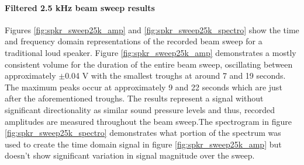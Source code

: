 \paragraph{Filtered 2.5 kHz beam sweep results}
Figures \ref{fig:spkr_sweep25k_amp} and \ref{fig:spkr_sweep25k_spectro} show the time and frequency domain representations of the recorded beam sweep for a traditional loud speaker. Figure \ref{fig:spkr_sweep25k_amp} demonstrates a mostly consistent volume for the duration of the entire beam sweep, oscillating between approximately $\pm$0.04 V with the smallest troughs at around 7 and 19 seconds. The maximum peaks occur at approximately 9 and 22 seconds which are just after the aforementioned troughs. The results represent a signal without significant directionality as similar sound pressure levels and thus, recorded amplitudes are measured throughout the beam sweep.The spectrogram in figure \ref{fig:spkr_sweep25k_spectro} demonstrates what portion of the spectrum was used to create the time domain signal in figure \ref{fig:spkr_sweep25k_amp} but doesn't show significant variation in signal magnitude over the sweep.
